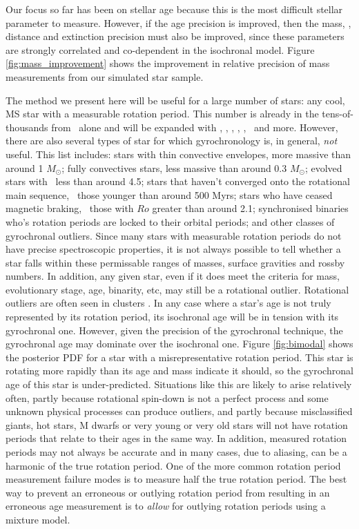 Our focus so far has been on stellar age because this is the most difficult
stellar parameter to measure.
However, if the age precision is improved, then the mass, \feh, distance and
extinction precision must also be improved, since these parameters are
strongly correlated and co-dependent in the isochronal model.
Figure \ref{fig:mass_improvement} shows the improvement in relative precision
of mass measurements from our simulated star sample.

The method we present here will be useful for a large number of stars: any
cool, MS star with a measurable rotation period.
This number is already in the tens-of-thousands from \kepler\ alone and will
be expanded with \tess, \lsst, \wfirst, \plato, \gaia, \panstarrs\ and more.
However, there are also several types of star for which gyrochronology is, in
general, {\it not} useful.
This list includes: stars with thin convective envelopes, more massive than
around 1 $M_\odot$; fully convectives stars, less massive than around 0.3
$M_\odot$; evolved stars with \logg\ less than around 4.5; stars that haven't
converged onto the rotational main sequence, \ie\ those younger than around
500 Myrs; stars who have ceased magnetic braking, \ie\ those with $Ro$ greater
than around 2.1; synchronised binaries who's rotation periods are locked to
their orbital periods; and other classes of gyrochronal outliers.
Since many stars with measurable rotation periods do not have precise
spectroscopic properties, it is not always possible to tell whether a star
falls within these permissable ranges of masses, surface gravities and rossby
numbers.
In addition, any given star, even if it does meet the criteria for mass,
evolutionary stage, age, binarity, etc, may still be a rotational outlier.
Rotational outliers are often seen in clusters \citep[see \eg][]{douglas}.
In any case where a star's age is not truly represented by its rotation
period, its isochronal age will be in tension with its gyrochronal one.
However, given the precision of the gyrochronal technique, the gyrochronal
age may dominate over the isochronal one.
Figure \ref{fig:bimodal} shows the posterior PDF for a star with a
misrepresentative rotation period.
This star is rotating more rapidly than its age and mass indicate it should,
so the gyrochronal age of this star is under-predicted.
Situations like this are likely to arise relatively often, partly because
rotational spin-down is not a perfect process and some unknown physical
processes can produce outliers, and partly because misclassified giants, hot
stars, M dwarfs or very young or very old stars will not have rotation periods
that relate to their ages in the same way.
In addition, measured rotation periods may not always be accurate and in many
cases, due to aliasing, can be a harmonic of the true rotation period.
One of the more common rotation period measurement failure modes is to measure
half the true rotation period.
The best way to prevent an erroneous or outlying rotation period from
resulting in an erroneous age measurement is to {\it allow} for outlying
rotation periods using a mixture model.

